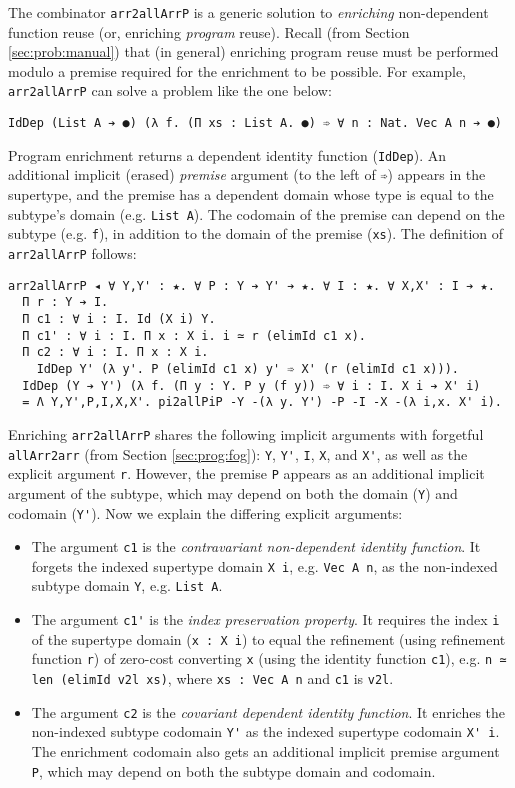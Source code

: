 \documentclass[acmsmall,screen]{acmart}
\newcommand{\refsec}[1]{Section \ref{sec:#1}}
\begin{document}
The combinator \verb;arr2allArrP; is a generic solution to
\textit{enriching} non-dependent function reuse
(or, enriching \textit{program} reuse).
Recall (from \refsec{prob:manual}) that (in general)
enriching program reuse must be
performed modulo a premise required for the enrichment
to be possible.
For example, \verb;arr2allArrP; can solve a problem like the one
below:
\begin{verbatim}
IdDep (List A ➔ ●) (λ f. (Π xs : List A. ●) ➾ ∀ n : Nat. Vec A n ➔ ●)
\end{verbatim}
Program enrichment returns a dependent identity function
(\verb;IdDep;). 
An additional implicit (erased) \textit{premise} argument
(to the left of \verb;➾;)
appears in the supertype, and the premise has a dependent domain
whose type is equal to the subtype's domain (e.g. \verb;List A;).
The codomain of the premise can depend on the subtype (e.g. \verb;f;),
in addition to the domain of the premise (\verb;xs;).
The definition of \verb;arr2allArrP; follows:
\begin{verbatim}
arr2allArrP ◂ ∀ Y,Y' : ★. ∀ P : Y ➔ Y' ➔ ★. ∀ I : ★. ∀ X,X' : I ➔ ★.
  Π r : Y ➔ I.
  Π c1 : ∀ i : I. Id (X i) Y.
  Π c1' : ∀ i : I. Π x : X i. i ≃ r (elimId c1 x).
  Π c2 : ∀ i : I. Π x : X i. 
    IdDep Y' (λ y'. P (elimId c1 x) y' ➾ X' (r (elimId c1 x))).
  IdDep (Y ➔ Y') (λ f. (Π y : Y. P y (f y)) ➾ ∀ i : I. X i ➔ X' i)
  = Λ Y,Y',P,I,X,X'. pi2allPiP -Y -(λ y. Y') -P -I -X -(λ i,x. X' i).
\end{verbatim}
Enriching \verb;arr2allArrP; shares the following implicit arguments
with forgetful \verb;allArr2arr; (from \refsec{prog:fog}): \verb;Y;,
\verb;Y';, \verb;I;, \verb;X;, and \verb;X';, as well as the explicit
argument \verb;r;.  However, the premise \verb;P; appears as an
additional implicit argument of the subtype, which may depend on both
the domain (\verb;Y;) and codomain (\verb;Y';). Now we explain the
differing explicit arguments:
\begin{itemize}
\item The argument \verb;c1; is the
  \textit{contravariant non-dependent identity function}.
  It forgets the indexed supertype domain \verb;X i;,
  e.g. \verb;Vec A n;,
  as the non-indexed subtype domain \verb;Y;,
  e.g. \verb;List A;. 

\item The argument \verb;c1'; is the
  \textit{index preservation property}.
  It requires the index \verb;i; of the supertype domain
  (\verb;x : X i;) to equal the refinement (using refinement
  function \verb;r;) of zero-cost converting \verb;x;
  (using the identity function \verb;c1;),
  e.g. \verb;n ≃ len (elimId v2l xs);, where
  \verb;xs : Vec A n; and \verb;c1; is \verb;v2l;.

\item The argument \verb;c2; is the
  \textit{covariant dependent identity function}.
  It enriches the non-indexed subtype codomain \verb;Y';
  as the indexed supertype codomain \verb;X' i;.
  The enrichment codomain also gets an additional implicit premise
  argument \verb;P;, which may depend on both the subtype domain and
  codomain.
\end{itemize}
\end{document}
